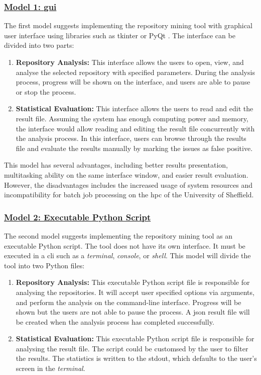 \documentclass[12pt, a4paper]{report}
\begin{document}
\subsubsection*{\underline{Model 1: \acrfull{gui}}} \label{subsec:model1}
The first model suggests implementing the repository mining tool with graphical user interface using
libraries such as tkinter \cite{tkinter} or PyQt \cite{pyqt}. The interface can be divided into two
parts:
\begin{enumerate}
  \item \textbf{Repository Analysis:} This interface allows the users to open, view, and analyse the
  selected repository with specified parameters. During the analysis process, progress will be shown
  on the interface, and users are able to pause or stop the process.
  \item \textbf{Statistical Evaluation:} This interface allows the users to read and edit the result
  file. Assuming the system has enough computing power and memory, the interface would allow reading
  and editing the result file concurrently with the analysis process. In this interface, users can
  browse through the results file and evaluate the results manually by marking the issues as false
  positive.
\end{enumerate}

This model has several advantages, including better results presentation, multitasking ability on
the same interface window, and easier result evaluation. However, the disadvantages includes the
increased usage of system resources and incompatibility for batch job processing on the
\acrfull{hpc} of the University of Sheffield.

\subsubsection*{\underline{Model 2: Executable Python Script}}\label{subsec:model2}
The second model suggests implementing the repository mining tool as an executable Python script.
The tool does not have its own interface. It must be executed in a \acrfull{cli} such as a
\textit{terminal}, \textit{console}, or \textit{shell}. This model will divide the tool into two
Python files:
\begin{enumerate}
  \item \textbf{Repository Analysis:} This executable Python script file is responsible for
  analysing the repositories. It will accept user specified options via arguments, and perform the
  analysis on the command-line interface. Progress will be shown but the users are not able to pause
  the process. A \acrshort{json} result file will be created when the analysis process has completed
  successfully.
  \item \textbf{Statistical Evaluation:} This executable Python script file is responsible for
  analysing the result file. The script could be customsed by the user to filter the results. The
  statistics is written to the \acrfull{stdout}, which defaults to the user's screen in the
  \textit{terminal}.
\end{enumerate}
\end{document}

